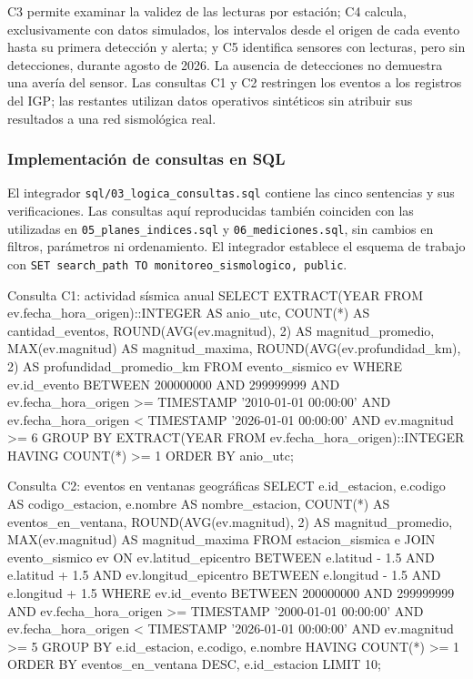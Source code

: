\documentclass[12pt,a4paper]{article}
\begin{document}
C3 permite examinar la validez de las lecturas por estación; C4
calcula, exclusivamente con datos simulados, los intervalos desde
el origen de cada evento hasta su primera detección y alerta; y C5
identifica sensores con lecturas, pero sin detecciones, durante
agosto de 2026. La ausencia de detecciones no demuestra una avería
del sensor. Las consultas C1 y C2 restringen los eventos a los
registros del IGP; las restantes utilizan datos operativos
sintéticos sin atribuir sus resultados a una red sismológica real.

\subsubsection{Implementación de consultas en SQL}
\label{sec:implementacion-consultas-experimento}

El integrador \texttt{sql/03\_logica\_consultas.sql} contiene
las cinco sentencias y sus verificaciones. Las consultas aquí
reproducidas también coinciden con las utilizadas en
\texttt{05\_planes\_indices.sql} y \texttt{06\_mediciones.sql},
sin cambios en filtros, parámetros ni ordenamiento. El integrador
establece el esquema de trabajo con
\texttt{SET search\_path TO monitoreo\_sismologico, public}.

\begin{sqlbloque}{Consulta C1: actividad sísmica anual}
SELECT
    EXTRACT(YEAR FROM ev.fecha_hora_origen)::INTEGER AS anio_utc,
    COUNT(*) AS cantidad_eventos,
    ROUND(AVG(ev.magnitud), 2) AS magnitud_promedio,
    MAX(ev.magnitud) AS magnitud_maxima,
    ROUND(AVG(ev.profundidad_km), 2) AS profundidad_promedio_km
FROM evento_sismico ev
WHERE ev.id_evento BETWEEN 200000000 AND 299999999
  AND ev.fecha_hora_origen >= TIMESTAMP '2010-01-01 00:00:00'
  AND ev.fecha_hora_origen < TIMESTAMP '2026-01-01 00:00:00'
  AND ev.magnitud >= 6
GROUP BY EXTRACT(YEAR FROM ev.fecha_hora_origen)::INTEGER
HAVING COUNT(*) >= 1
ORDER BY anio_utc;
\end{sqlbloque}

\begin{sqlbloque}{Consulta C2: eventos en ventanas geográficas}
SELECT
    e.id_estacion,
    e.codigo AS codigo_estacion,
    e.nombre AS nombre_estacion,
    COUNT(*) AS eventos_en_ventana,
    ROUND(AVG(ev.magnitud), 2) AS magnitud_promedio,
    MAX(ev.magnitud) AS magnitud_maxima
FROM estacion_sismica e
JOIN evento_sismico ev
  ON ev.latitud_epicentro BETWEEN e.latitud - 1.5 AND e.latitud + 1.5
 AND ev.longitud_epicentro BETWEEN e.longitud - 1.5 AND e.longitud + 1.5
WHERE ev.id_evento BETWEEN 200000000 AND 299999999
  AND ev.fecha_hora_origen >= TIMESTAMP '2000-01-01 00:00:00'
  AND ev.fecha_hora_origen < TIMESTAMP '2026-01-01 00:00:00'
  AND ev.magnitud >= 5
GROUP BY e.id_estacion, e.codigo, e.nombre
HAVING COUNT(*) >= 1
ORDER BY eventos_en_ventana DESC, e.id_estacion
LIMIT 10;
\end{sqlbloque}
\end{document}
